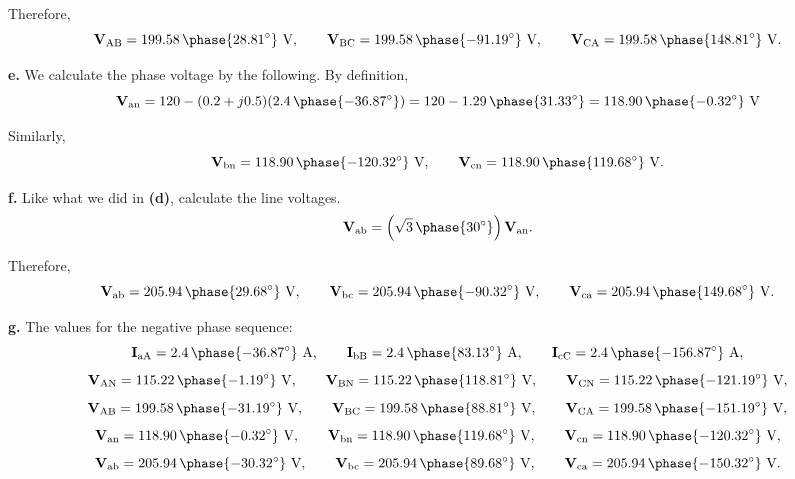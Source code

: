 \documentclass[11pt]{article}
\begin{document}
\begin{enumerate}[leftmargin=*,label=\textbf{\arabic*.}]
Therefore,
\[\mathbf{V}_{\text{AB}}=199.58\,\phase{28.81^\circ}\text{ V},\qquad\mathbf{V}_{\text{BC}}=199.58\,\phase{-91.19^\circ}\text{ V},\qquad\mathbf{V}_{\text{CA}}=199.58\,\phase{148.81^\circ}\text{ V}.\]

\vspace{1em}

\textbf{e.} We calculate the phase voltage by the following. By definition,
\[\mathbf{V}_{\text{an}}=120-(0.2+j0.5)(2.4\,\phase{-36.87^\circ})=120-1.29\,\phase{31.33^\circ}=118.90\,\phase{-0.32^\circ}\text{ V}\]

Similarly,
\[\mathbf{V}_{\text{bn}}=118.90\,\phase{-120.32^\circ}\text{ V},\qquad \mathbf{V}_{\text{cn}}=118.90\,\phase{119.68^\circ}\text{ V}.\]

\vspace{1em}

\textbf{f.} Like what we did in \textbf{(d)}, calculate the line voltages.
\[\mathbf{V}_{\text{ab}}=\left(\sqrt3\,\phase{30^\circ}\right)\mathbf{V}_{\text{an}}.\]

Therefore,
\[\mathbf{V}_{\text{ab}}=205.94\,\phase{29.68^\circ}\text{ V},\qquad\mathbf{V}_{\text{bc}}=205.94\,\phase{-90.32^\circ}\text{ V},\qquad\mathbf{V}_{\text{ca}}=205.94\,\phase{149.68^\circ}\text{ V}.\]

\vspace{1em}

\textbf{g.} The values for the negative phase sequence:
\[\mathbf{I}_{\text{aA}}=2.4\,\phase{-36.87^{\circ}}\text{ A},\qquad\mathbf{I}_{\text{bB}}=2.4\,\phase{83.13^{\circ}}\text{ A},\qquad \mathbf{I}_{\text{cC}}=2.4\,\phase{-156.87^{\circ}}\text{ A},\]
\[\mathbf{V}_{\text{AN}}=115.22\,\phase{-1.19^{\circ}}\text{ V},\qquad\mathbf{V}_{\text{BN}}=115.22\,\phase{118.81^{\circ}}\text{ V},\qquad\mathbf{V}_{\text{CN}}=115.22\,\phase{-121.19^{\circ}}\text{ V},\]
\[\mathbf{V}_{\text{AB}}=199.58\,\phase{-31.19^\circ}\text{ V},\qquad\mathbf{V}_{\text{BC}}=199.58\,\phase{88.81^\circ}\text{ V},\qquad\mathbf{V}_{\text{CA}}=199.58\,\phase{-151.19^\circ}\text{ V},\]
\[\mathbf{V}_{\text{an}}=118.90\,\phase{-0.32^\circ}\text{ V},\qquad\mathbf{V}_{\text{bn}}=118.90\,\phase{119.68^\circ}\text{ V},\qquad \mathbf{V}_{\text{cn}}=118.90\,\phase{-120.32^\circ}\text{ V},\]
\[\mathbf{V}_{\text{ab}}=205.94\,\phase{-30.32^\circ}\text{ V},\qquad\mathbf{V}_{\text{bc}}=205.94\,\phase{89.68^\circ}\text{ V},\qquad\mathbf{V}_{\text{ca}}=205.94\,\phase{-150.32^\circ}\text{ V}.\]

\vspace{1em}


\end{enumerate}
\end{document}
